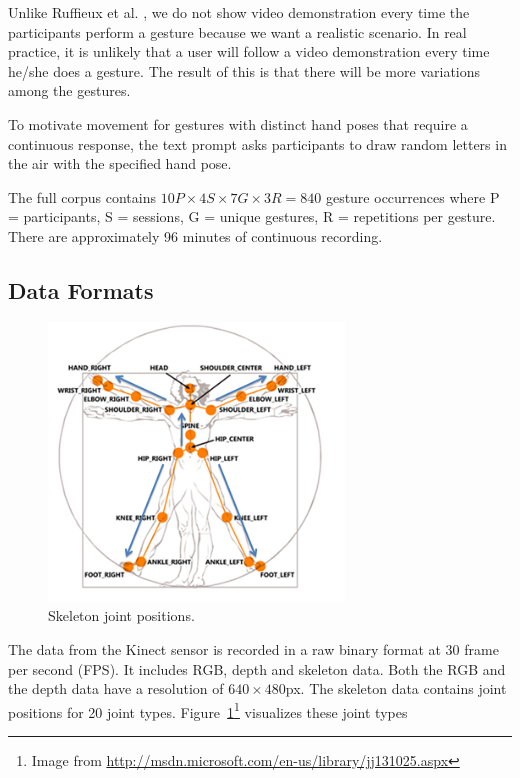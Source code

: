 Unlike Ruffieux et al. \cite{Ruffieux2013}, we do not show video demonstration
every time the participants perform a gesture because we want a
realistic scenario. In real practice, it is unlikely that a user will follow a
video demonstration every time he/she does a gesture. The result of this is that
there will be more variations among the gestures.

To motivate movement for gestures with distinct hand poses that
require a continuous response, the text prompt asks participants to draw
random letters in the air with the specified hand pose. 

The full corpus contains $
10P \times 4S \times 7G \times 3R = 840$ gesture occurrences
where P = participants, S = sessions, G = unique gestures, R = repetitions per
gesture. There are approximately 96 minutes of continuous recording.

\subsection{Data Formats}

\begin{figure}[tbh]
\centering
\includegraphics[width=0.7\textwidth]{figures/skeleton.png}
\caption{Skeleton joint positions.}
\label{fig:skeleton}
\end{figure}

The data from the Kinect sensor is recorded in a raw binary format at 30
frame per second (FPS). It includes RGB, depth and skeleton data. Both the RGB
and the depth data have a resolution of $640\times480$px. The skeleton data
contains joint positions for 20 joint types. Figure~\ref{fig:skeleton}\footnote{Image from
\url{http://msdn.microsoft.com/en-us/library/jj131025.aspx} } visualizes these
joint types

